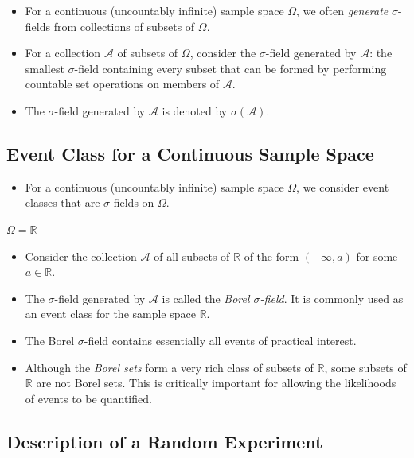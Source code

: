 \begin{itemize}
\item For a continuous (uncountably infinite) sample space $\Omega$, we often \textit{generate} $\sigma$-fields from collections of subsets of $\Omega$.
\item For a collection $\mathcal{A}$ of subsets of $\Omega$, consider the $\sigma$-field generated by $\mathcal{A}$: the smallest $\sigma$-field containing every subset that can be formed by performing countable set operations on members of $\mathcal{A}$.
\item The $\sigma$-field generated by $\mathcal{A}$ is denoted by $\sigma(\mathcal{A})$.
\end{itemize}

\subsection{Event Class for a Continuous Sample Space}

\begin{itemize}
\item For a continuous (uncountably infinite) sample space $\Omega$, we consider event classes that are $\sigma$-fields on $\Omega$.
\end{itemize}

\begin{example}\textbf{$\Omega=\mathbb{R}$}\\
\begin{itemize}
\item Consider the collection $\mathcal{A}$ of all subsets of $\mathbb{R}$ of the form $( -\infty,a)$ for some $a\in\mathbb{R}$.
\item The $\sigma$-field generated by $\mathcal{A}$ is called the \textit{Borel $\sigma$-field}. It is commonly used as an event class for the sample space $\mathbb{R}$.
\item The Borel $\sigma$-field contains essentially all events of practical interest.
\item Although the \textit{Borel sets} form a very rich class of subsets of $\mathbb{R}$, some subsets of $\mathbb{R}$ are not Borel sets. This is critically important for allowing the likelihoods of events to be quantified.
\end{itemize}

\end{example}\subsection{Description of a Random Experiment}

